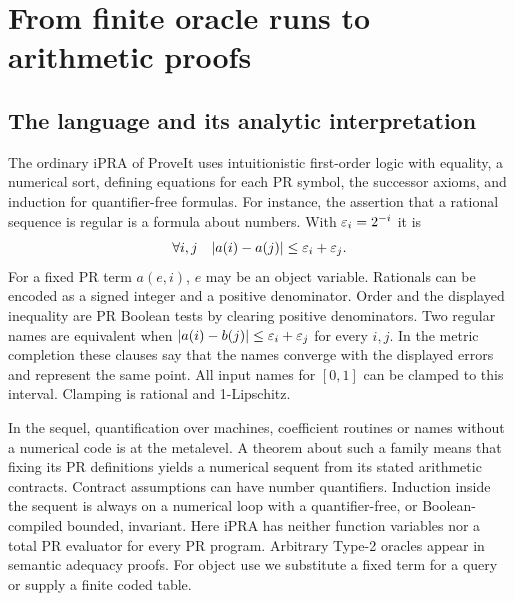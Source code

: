 \section{From finite oracle runs to arithmetic proofs}
\label{sec:framework}
\subsection{The language and its analytic interpretation}
The ordinary iPRA of ProveIt uses intuitionistic first-order logic with equality, a numerical sort, defining equations for each PR symbol, the successor axioms, and induction for quantifier-free formulas. For instance, the assertion that a rational sequence is regular is a formula about numbers. With $\varepsilon_i=2^{-i}$ it is
\[
   \forall i,j\quad |a(i)-a(j)|\le\varepsilon_i+\varepsilon_j .
\]
For a fixed PR term $a(e,i)$, $e$ may be an object variable. Rationals can be encoded as a signed integer and a positive denominator. Order and the displayed inequality are PR Boolean tests by clearing positive denominators. Two regular names are equivalent when $|a(i)-b(j)|\le\varepsilon_i+\varepsilon_j$ for every $i,j$. In the metric completion these clauses say that the names converge with the displayed errors and represent the same point. All input names for $[0,1]$ can be clamped to this interval. Clamping is rational and 1-Lipschitz.

In the sequel, quantification over machines, coefficient routines or names without a numerical code is at the metalevel. A theorem about such a family means that fixing its PR definitions yields a numerical sequent from its stated arithmetic contracts. Contract assumptions can have number quantifiers. Induction inside the sequent is always on a numerical loop with a quantifier-free, or Boolean-compiled bounded, invariant. Here iPRA has neither function variables nor a total PR evaluator for every PR program. Arbitrary Type-2 oracles appear in semantic adequacy proofs. For object use we substitute a fixed term for a query or supply a finite coded table.

